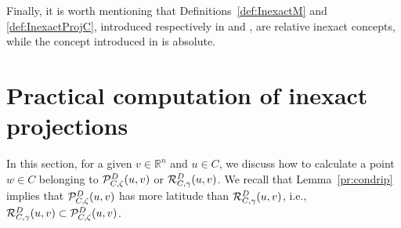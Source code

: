 Finally, it is worth mentioning that Definitions~\ref{def:InexactM} and \ref{def:InexactProjC}, introduced respectively in \cite{BirginMartinezRaydan2003} and \cite{OrizonFabianaGilson2018},  are relative inexact  concepts, while the concept introduced in \cite{SalzoVilla2012,VillaSalzo2013} is absolute.



\section{Practical computation of  inexact projections} \label{sec:pcip}

In this section,  for a given  $v\in {\mathbb R}^n$ and   $u \in C$, we discuss how to calculate a  point  $w \in C$ belonging to  ${\cal P}_{C, \zeta}^{D}(u,v)$ or ${\cal R}_{C, \gamma}^{D}(u,v)$.  We recall that  Lemma~\ref{pr:condrip} implies that ${\cal P}_{C, \zeta}^{D}(u,v)$ has  more latitude than ${\cal R}_{C, \gamma}^{D}(u,v)$, i.e., ${\cal R}_{C, \gamma}^{D}(u,v) \subset {\cal P}_{C, \zeta}^{D}(u,v)$.

